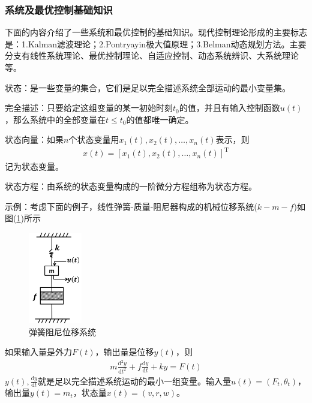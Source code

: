         \subsubsection{系统及最优控制基础知识}
            \par
            下面的内容介绍了一些系统和最优控制的基础知识。现代控制理论形成的主要标志是：1.Kalman滤波理论；2.Pontryayin极大值原理；3.Belman动态规划方法。主要分支有线性系统理论、最优控制理论、自适应控制、动态系统辨识、大系统理论等。
            \par
            状态：是一些变量的集合，它们是足以完全描述系统全部运动的最小变量集。
            \par
            完全描述：只要给定这组变量的某一初始时刻$t_0$的值，并且有输入控制函数$u(t)$，那么系统中的全部变量在$t \leqslant t_0$的值都唯一确定。
            \par
            状态向量：如果$n$个状态变量用$x_1(t),x_2(t),\dots,x_n(t)$表示，则
            \begin{align*}
            x(t) = [x_1(t),x_2(t),\dots,x_n(t)]^\mathrm{T}
            \end{align*}
            记为状态变量。
            \par
            状态方程：由系统的状态变量构成的一阶微分方程组称为状态方程。
            \par
            示例：考虑下面的例子，线性弹簧-质量-阻尼器构成的机械位移系统($k-m-f$)如图(\ref{fig:弹簧阻尼位移系统})所示
            \begin{figure}[H]
            \centering
            \includegraphics[height=4cm]{images/spring.jpg}
            \caption{弹簧阻尼位移系统}
            \label{fig:弹簧阻尼位移系统}
            \end{figure}
            如果输入量是外力$F(t)$，输出量是位移$y(t)$，则
            \begin{align*}
            m\frac{\mathrm{d}^2y}{\mathrm{d}t^2} + f\frac{\mathrm{d}y}{\mathrm{d}t} + ky =F(t)
            \end{align*}
            $y(t),\frac{\mathrm{d}y}{\mathrm{d}t}$就是足以完全描述系统运动的最小一组变量。输入量$u(t)= (F_t,\theta_t)$，输出量$y(t) = m_t$，状态量$x(t) = (v,r,w)$。
